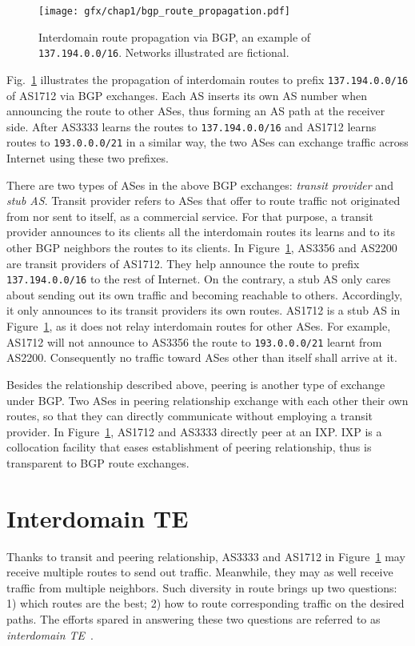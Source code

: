 \begin{figure}[!htb]
\centering
\texttt{[image: gfx/chap1/bgp\_route\_propagation.pdf]}
\caption{Interdomain route propagation via \ac{BGP}, an example of \texttt{137.194.0.0/16}. Networks illustrated are fictional.}
\label{fig:bgp_propa}
\end{figure}

Fig.~\ref{fig:bgp_propa} illustrates the propagation of interdomain routes to prefix \texttt{137.194.0.0/16} of AS1712 via BGP exchanges. Each AS inserts its own AS number when announcing the route to other ASes, thus forming an AS path at the receiver side. After AS3333 learns the routes to \texttt{137.194.0.0/16} and AS1712 learns routes to \texttt{193.0.0.0/21} in a similar way, the two ASes can exchange traffic across Internet using these two prefixes.

There are two types of ASes in the above BGP exchanges: \textit{transit provider} and \textit{stub AS}.
Transit provider refers to ASes that offer to route traffic not originated from nor sent to itself, as a commercial service.
For that purpose, a transit provider announces to its clients all the interdomain routes its learns and to its other BGP neighbors the routes to its clients.
In Figure~\ref{fig:bgp_propa}, AS3356 and AS2200 are transit providers of AS1712. They help announce the route to prefix \texttt{137.194.0.0/16}
to the rest of Internet.
On the contrary, a stub AS only cares about sending out its own traffic and becoming reachable to others.
Accordingly, it only announces to its transit providers its own routes. 
AS1712 is a stub AS in Figure~\ref{fig:bgp_propa}, as it does not relay interdomain routes for other ASes. For example, AS1712 will not announce to AS3356 the route to \texttt{193.0.0.0/21} learnt from AS2200. Consequently no traffic toward ASes other than itself shall arrive at it.

Besides the relationship described above, peering is another type of exchange under BGP. Two ASes in peering relationship exchange with each other their own routes, so that they can directly communicate without employing a transit provider.
In Figure~\ref{fig:bgp_propa}, AS1712 and AS3333 directly peer at an \ac{IXP}.
\ac{IXP} is a collocation facility that eases establishment of peering relationship, thus is transparent to BGP route exchanges.

\section{Interdomain TE}
Thanks to transit and peering relationship, AS3333 and AS1712 in Figure~\ref{fig:bgp_propa} may receive multiple routes to send out traffic.
Meanwhile, they may as well receive traffic from multiple neighbors.
Such diversity in route brings up two questions: 1) which routes are the best; 2) how to route corresponding traffic on the desired paths.
The efforts spared in answering these two questions are referred to as \textit{interdomain \ac{TE}}~\cite{Quoitin2004a,Quoitin2003,Feamster2003}.

